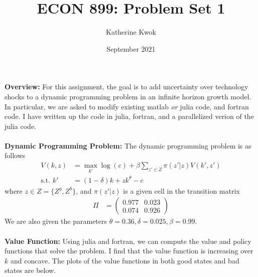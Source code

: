 \documentclass[12pt]{article}
\title{ECON 899: Problem Set 1}
\author{Katherine Kwok}
\date{September 2021}
\begin{document}
\maketitle
\noindent \textbf{Overview: } For this assignment, the goal is to add uncertainty over technology shocks to a dynamic programming problem in an infinite horizon growth model. In particular, we are asked to modify existing matlab \textit{or} julia code, and fortran code. I have written up the code in julia, fortran, and a parallelized verion of the julia code. \\\\
\textbf{Dynamic Programming Problem: } The dynamic programming problem is as follows
\begin{align*}
    V(k, z) &= \max_{k'} \log(c) + \beta \sum_{z' \in Z} \pi(z'|z) V(k', z') \\
    \text{s.t. } k' &= (1-\delta)k + zk^{\theta} - c
\end{align*}
where $z \in Z = \{Z^g, Z^b\}$, and $\pi(z'|z)$ is a given cell in the transition matrix 
\begin{align*}
    \Pi &= \begin{pmatrix} 0.977 & 0.023 \\ 0.074 & 0.926\end{pmatrix}
\end{align*}
We are also given the parameters $\theta = 0.36, \delta = 0.025, \beta = 0.99$.\\\\
\textbf{Value Function: }Using julia and fortran, we can compute the value and policy functions that solve the problem. I find that the value function is increasing over $k$ and concave. The plots of the value functions in both good states and bad states are below.
\end{document}
